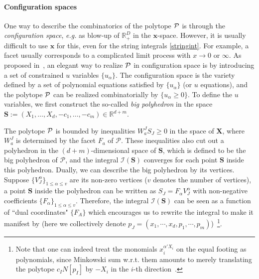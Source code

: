 \documentclass[hidelinks,12pt]{article}
\begin{document}
\paragraph{Configuration spaces} One way to describe the combinatorics of the polytope ${\cal P}$ is through the {\it configuration space}, {\it e.g.} as blow-up of $\mathbb R_+^D$ in the $\mathbf x$-space. However, it is usually difficult to use $\mathbf x$ for this, even for the string integrals \eqref{stringint}. For example, a facet usually corresponds to a complicated limit process with $x \to 0$ or $\infty$. As proposed in~\cite{}, an elegant way to realize ${\cal P}$ in configuration space is by introducing a set of constrained $u$ variables $\{u_\alpha\}$. The configuration space is the variety defined by a set of polynomial equations satisfied by $\{u_\alpha\}$ (or $u$ equations), and the polytope ${\cal P}$ can be realized combinatorially by $\{u_\alpha \geq 0\}$. 
To define the $u$ variables, we first construct the so-called \textit{big polyhedron} in the space $\mathbf S:=(X_1,\dots,X_d,-c_1,\dots,-c_m) \in \mathbb R^{d{+}m}$.  %

The polytope ${\cal P}$ is bounded by inequalities $W_a^JS_J\geq 0$ in the space of $\mathbf X$, where $W_a^J$ is determined by the facet $F_a$ of $\mathcal P$.  These inequalities also cut out a polyhedron in the $(d+m)$-dimensional space of $\mathbf S$, which is defined to be the big polyhedron of $\mathcal P$, 
and the integral $\mathcal I(\mathbf S)$ converges for each point $\mathbf S$ 
inside this polyhedron. Dually, we can describe the big polyhedron by its vertices. Suppose 
$\{V_J^\alpha\}_{1\leq \alpha \leq v}$ are its non-zero vertices ($v$ denotes the number of vertices), a point $\mathbf S$ inside 
the polyhedron can be written as $S_J = F_\alpha V^\alpha_J$ with non-negative coefficients 
$\{F_\alpha\}_{1\leq \alpha \leq v}$.  Therefore, the integral $\mathcal I(\mathbf S)$
can be seen as a function of ``dual coordinates" $\{F_A\}$ which encourages us to 
rewrite the integral to make it manifest by (here we collectively denote $p_J=(x_1, \cdots, x_d, p_1, \cdots, p_m)$)~\footnote{Note that one can indeed treat the monomials $x_i^{\alpha' X_i}$ on the equal footing as polynomials, since Minkowski sum w.r.t. them amounts to merely translating the polytope $c_I N[p_I]$ by $-X_i$ in the $i$-th direction~\cite{}.}. 
\end{document}
